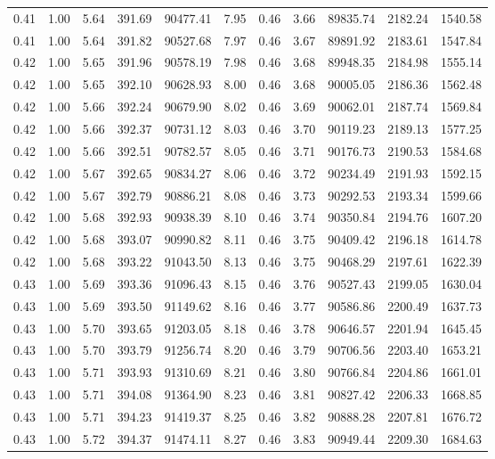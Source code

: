 \begin{table}[!ht]
\begin{tabular}{rrrrrrrrrrr}
0.41 & 1.00 & 5.64 & 391.69 & 90477.41 & 7.95 & 0.46 & 3.66 & 89835.74 & 2182.24 & 1540.58 \\
0.41 & 1.00 & 5.64 & 391.82 & 90527.68 & 7.97 & 0.46 & 3.67 & 89891.92 & 2183.61 & 1547.84 \\
0.42 & 1.00 & 5.65 & 391.96 & 90578.19 & 7.98 & 0.46 & 3.68 & 89948.35 & 2184.98 & 1555.14 \\
0.42 & 1.00 & 5.65 & 392.10 & 90628.93 & 8.00 & 0.46 & 3.68 & 90005.05 & 2186.36 & 1562.48 \\
0.42 & 1.00 & 5.66 & 392.24 & 90679.90 & 8.02 & 0.46 & 3.69 & 90062.01 & 2187.74 & 1569.84 \\
0.42 & 1.00 & 5.66 & 392.37 & 90731.12 & 8.03 & 0.46 & 3.70 & 90119.23 & 2189.13 & 1577.25 \\
0.42 & 1.00 & 5.66 & 392.51 & 90782.57 & 8.05 & 0.46 & 3.71 & 90176.73 & 2190.53 & 1584.68 \\
0.42 & 1.00 & 5.67 & 392.65 & 90834.27 & 8.06 & 0.46 & 3.72 & 90234.49 & 2191.93 & 1592.15 \\
0.42 & 1.00 & 5.67 & 392.79 & 90886.21 & 8.08 & 0.46 & 3.73 & 90292.53 & 2193.34 & 1599.66 \\
0.42 & 1.00 & 5.68 & 392.93 & 90938.39 & 8.10 & 0.46 & 3.74 & 90350.84 & 2194.76 & 1607.20 \\
0.42 & 1.00 & 5.68 & 393.07 & 90990.82 & 8.11 & 0.46 & 3.75 & 90409.42 & 2196.18 & 1614.78 \\
0.42 & 1.00 & 5.68 & 393.22 & 91043.50 & 8.13 & 0.46 & 3.75 & 90468.29 & 2197.61 & 1622.39 \\
0.43 & 1.00 & 5.69 & 393.36 & 91096.43 & 8.15 & 0.46 & 3.76 & 90527.43 & 2199.05 & 1630.04 \\
0.43 & 1.00 & 5.69 & 393.50 & 91149.62 & 8.16 & 0.46 & 3.77 & 90586.86 & 2200.49 & 1637.73 \\
0.43 & 1.00 & 5.70 & 393.65 & 91203.05 & 8.18 & 0.46 & 3.78 & 90646.57 & 2201.94 & 1645.45 \\
0.43 & 1.00 & 5.70 & 393.79 & 91256.74 & 8.20 & 0.46 & 3.79 & 90706.56 & 2203.40 & 1653.21 \\
0.43 & 1.00 & 5.71 & 393.93 & 91310.69 & 8.21 & 0.46 & 3.80 & 90766.84 & 2204.86 & 1661.01 \\
0.43 & 1.00 & 5.71 & 394.08 & 91364.90 & 8.23 & 0.46 & 3.81 & 90827.42 & 2206.33 & 1668.85 \\
0.43 & 1.00 & 5.71 & 394.23 & 91419.37 & 8.25 & 0.46 & 3.82 & 90888.28 & 2207.81 & 1676.72 \\
0.43 & 1.00 & 5.72 & 394.37 & 91474.11 & 8.27 & 0.46 & 3.83 & 90949.44 & 2209.30 & 1684.63 \\

\end{tabular}
\end{table}
